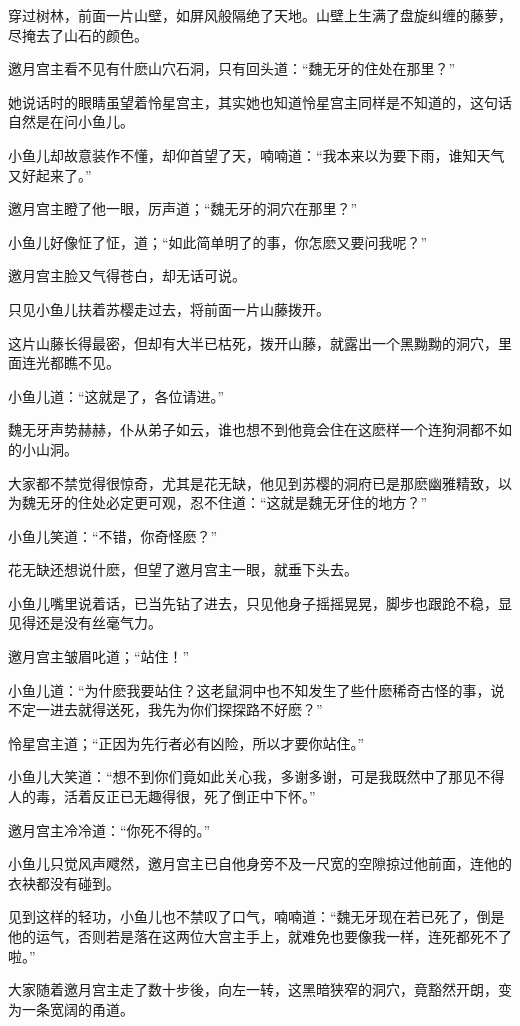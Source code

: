 \documentclass[12pt,oneside]{book}
\begin{document}
穿过树林，前面一片山壁，如屏风般隔绝了天地。山壁上生满了盘旋纠缠的藤萝，尽掩去了山石的颜色。

邀月宫主看不见有什麽山穴石洞，只有回头道：``魏无牙的住处在那里？''

她说话时的眼睛虽望着怜星宫主，其实她也知道怜星宫主同样是不知道的，这句话自然是在问小鱼儿。

小鱼儿却故意装作不懂，却仰首望了天，喃喃道：``我本来以为要下雨，谁知天气又好起来了。''

邀月宫主瞪了他一眼，厉声道；``魏无牙的洞穴在那里？''

小鱼儿好像怔了怔，道；``如此简单明了的事，你怎麽又要问我呢？''

邀月宫主脸又气得苍白，却无话可说。

只见小鱼儿扶着苏樱走过去，将前面一片山藤拨开。

这片山藤长得最密，但却有大半已枯死，拨开山藤，就露出一个黑黝黝的洞穴，里面连光都瞧不见。

小鱼儿道：``这就是了，各位请进。''

魏无牙声势赫赫，仆从弟子如云，谁也想不到他竟会住在这麽样一个连狗洞都不如的小山洞。

大家都不禁觉得很惊奇，尤其是花无缺，他见到苏樱的洞府已是那麽幽雅精致，以为魏无牙的住处必定更可观，忍不住道：``这就是魏无牙住的地方？''

小鱼儿笑道：``不错，你奇怪麽？''

花无缺还想说什麽，但望了邀月宫主一眼，就垂下头去。

小鱼儿嘴里说着话，已当先钻了进去，只见他身子摇摇晃晃，脚步也跟跄不稳，显见得还是没有丝毫气力。

邀月宫主皱眉叱道；``站住！''

小鱼儿道：``为什麽我要站住？这老鼠洞中也不知发生了些什麽稀奇古怪的事，说不定一进去就得送死，我先为你们探探路不好麽？''

怜星宫主道；``正因为先行者必有凶险，所以才要你站住。''

小鱼儿大笑道：``想不到你们竟如此关心我，多谢多谢，可是我既然中了那见不得人的毒，活着反正已无趣得很，死了倒正中下怀。''

邀月宫主冷冷道：``你死不得的。''

小鱼儿只觉风声飕然，邀月宫主已自他身旁不及一尺宽的空隙掠过他前面，连他的衣袂都没有碰到。

见到这样的轻功，小鱼儿也不禁叹了口气，喃喃道：``魏无牙现在若已死了，倒是他的运气，否则若是落在这两位大宫主手上，就难免也要像我一样，连死都死不了啦。''

大家随着邀月宫主走了数十步後，向左一转，这黑暗狭窄的洞穴，竟豁然开朗，变为一条宽阔的甬道。
\end{document}
